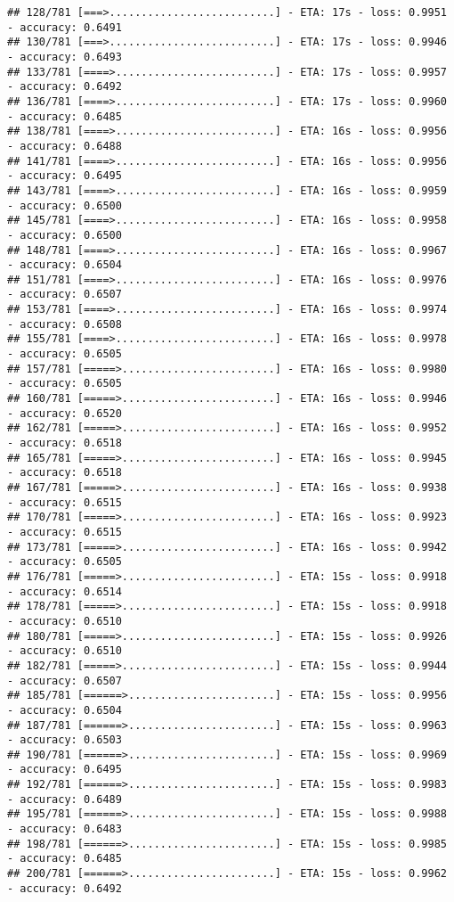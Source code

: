 \documentclass[
]{article}
\begin{document}
\begin{verbatim}
## 128/781 [===>..........................] - ETA: 17s - loss: 0.9951 - accuracy: 0.6491
## 130/781 [===>..........................] - ETA: 17s - loss: 0.9946 - accuracy: 0.6493
## 133/781 [====>.........................] - ETA: 17s - loss: 0.9957 - accuracy: 0.6492
## 136/781 [====>.........................] - ETA: 17s - loss: 0.9960 - accuracy: 0.6485
## 138/781 [====>.........................] - ETA: 16s - loss: 0.9956 - accuracy: 0.6488
## 141/781 [====>.........................] - ETA: 16s - loss: 0.9956 - accuracy: 0.6495
## 143/781 [====>.........................] - ETA: 16s - loss: 0.9959 - accuracy: 0.6500
## 145/781 [====>.........................] - ETA: 16s - loss: 0.9958 - accuracy: 0.6500
## 148/781 [====>.........................] - ETA: 16s - loss: 0.9967 - accuracy: 0.6504
## 151/781 [====>.........................] - ETA: 16s - loss: 0.9976 - accuracy: 0.6507
## 153/781 [====>.........................] - ETA: 16s - loss: 0.9974 - accuracy: 0.6508
## 155/781 [====>.........................] - ETA: 16s - loss: 0.9978 - accuracy: 0.6505
## 157/781 [=====>........................] - ETA: 16s - loss: 0.9980 - accuracy: 0.6505
## 160/781 [=====>........................] - ETA: 16s - loss: 0.9946 - accuracy: 0.6520
## 162/781 [=====>........................] - ETA: 16s - loss: 0.9952 - accuracy: 0.6518
## 165/781 [=====>........................] - ETA: 16s - loss: 0.9945 - accuracy: 0.6518
## 167/781 [=====>........................] - ETA: 16s - loss: 0.9938 - accuracy: 0.6515
## 170/781 [=====>........................] - ETA: 16s - loss: 0.9923 - accuracy: 0.6515
## 173/781 [=====>........................] - ETA: 16s - loss: 0.9942 - accuracy: 0.6505
## 176/781 [=====>........................] - ETA: 15s - loss: 0.9918 - accuracy: 0.6514
## 178/781 [=====>........................] - ETA: 15s - loss: 0.9918 - accuracy: 0.6510
## 180/781 [=====>........................] - ETA: 15s - loss: 0.9926 - accuracy: 0.6510
## 182/781 [=====>........................] - ETA: 15s - loss: 0.9944 - accuracy: 0.6507
## 185/781 [======>.......................] - ETA: 15s - loss: 0.9956 - accuracy: 0.6504
## 187/781 [======>.......................] - ETA: 15s - loss: 0.9963 - accuracy: 0.6503
## 190/781 [======>.......................] - ETA: 15s - loss: 0.9969 - accuracy: 0.6495
## 192/781 [======>.......................] - ETA: 15s - loss: 0.9983 - accuracy: 0.6489
## 195/781 [======>.......................] - ETA: 15s - loss: 0.9988 - accuracy: 0.6483
## 198/781 [======>.......................] - ETA: 15s - loss: 0.9985 - accuracy: 0.6485
## 200/781 [======>.......................] - ETA: 15s - loss: 0.9962 - accuracy: 0.6492

\end{verbatim}
\end{document}
